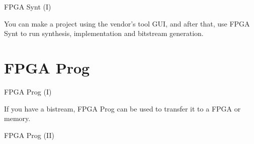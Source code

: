 \documentclass{beamer}
\begin{document}
\begin{frame}[fragile]{FPGA Synt (I)}
  \begin{block}{}
    You can make a project using the vendor's tool GUI, and after that, use FPGA Synt to run
    synthesis, implementation and bitstream generation.
  \end{block}{}
  \scriptsize
  
\end{frame}



\section{FPGA Prog}

\begin{frame}[fragile]{FPGA Prog (I)}
  \begin{block}{}
    If you have a bistream, FPGA Prog can be used to transfer it to a FPGA or memory.
  \end{block}{}
  \tiny
  
\end{frame}

\begin{frame}[fragile]{FPGA Prog (II)}
  \tiny
  
\end{frame}

\end{document}
